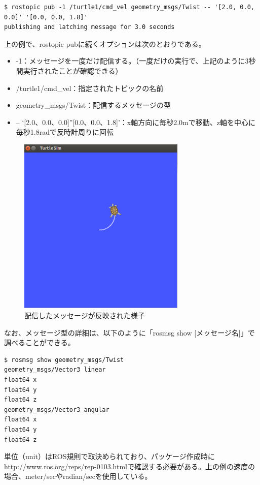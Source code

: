 \begin{lstlisting}[language=ROS]
$ rostopic pub -1 /turtle1/cmd_vel geometry_msgs/Twist -- '[2.0, 0.0, 0.0]' '[0.0, 0.0, 1.8]'
publishing and latching message for 3.0 seconds
\end{lstlisting}

上の例で、rostopic pubに続くオプションは次のとおりである。

\begin{itemize}
\item -1：メッセージを一度だけ配信する。（一度だけの実行で、上記のように3秒間実行されたことが確認できる）
\item /turtle1/cmd\_vel：指定されたトピックの名前
\item geometry\_msgs/Twist：配信するメッセージの型
\item -- ‘[2.0、0.0、0.0]''[0.0、0.0、1.8]’：x軸方向に毎秒2.0mで移動、z軸を中心に毎秒1.8radで反時計周りに回転
\end{itemize}

\begin{figure}[h]
  \centering
  \includegraphics[width=8cm]{pictures/chapter4/pic_04_02.png}
  \caption{配信したメッセージが反映された様子}
\end{figure}

なお、メッセージ型の詳細は、以下のように「rosmsg show [メッセージ名]」で調べることができる。

\begin{lstlisting}[language=ROS]
$ rosmsg show geometry_msgs/Twist
geometry_msgs/Vector3 linear
float64 x
float64 y
float64 z
geometry_msgs/Vector3 angular
float64 x
float64 y
float64 z
\end{lstlisting}

\begin{exercise}[ROSで使用される単位]
単位（unit）はROS規則で取決められており、パッケージ作成時にhttp://www.ros.org/reps/rep-0103.htmlで確認する必要がある。上の例の速度の場合、meter/secやradian/secを使用している。
\end{exercise}


